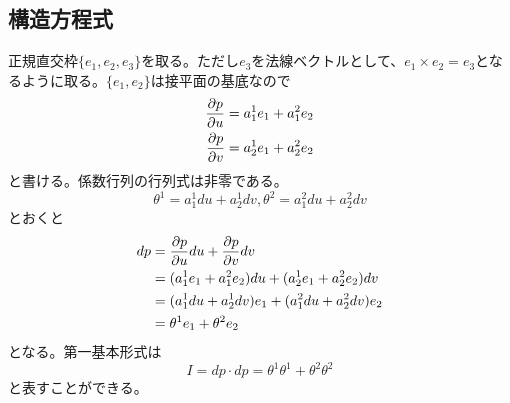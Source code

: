     \subsection{構造方程式}
        正規直交枠$\{e_1, e_2, e_3\}$を取る。ただし$e_3$を法線ベクトルとして、$e_1 \times e_2 = e_3$となるように取る。$\{e_1, e_2\}$は接平面の基底なので
        \begin{align*}
            \pd[p]{u} &= a^1_1e_1 + a^2_1e_2\\
            \pd[p]{v} &= a^1_2e_1 + a^2_2e_2\\
        \end{align*}
        と書ける。係数行列の行列式は非零である。
            \[\theta^1 = a^1_1du + a^1_2dv, \theta^2 = a^2_1du + a^2_2dv\]
        とおくと
        \begin{align*}
            dp &= \pd[p]{u}du + \pd[p]{v}dv\\
            &= (a^1_1e_1 + a^2_1e_2)du + (a^1_2e_1 + a^2_2e_2)dv\\
            &= (a^1_1du + a^1_2dv)e_1 + (a^2_1du + a^2_2dv)e_2\\
            &= \theta^1e_1 + \theta^2e_2
        \end{align*}
        となる。第一基本形式は
            \[I = dp \cdot dp = \theta^1\theta^1 + \theta^2\theta^2\]
        と表すことができる。

